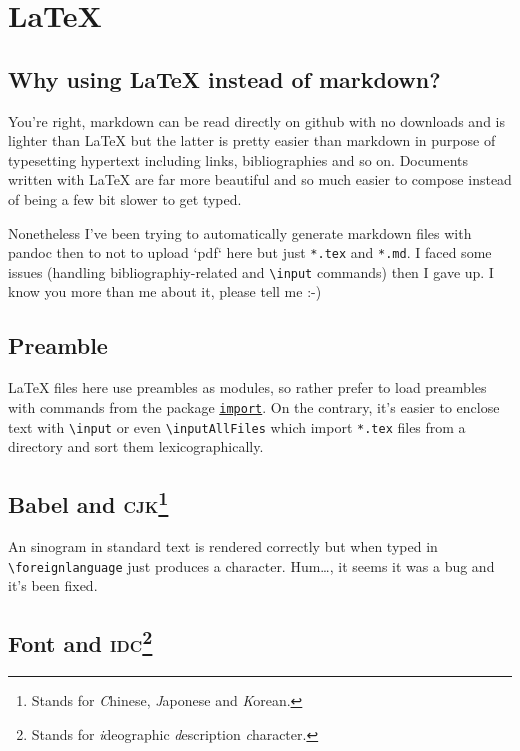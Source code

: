 \section{\LaTeX{}}

\subsection{Why using \LaTeX{} instead of markdown?}

You're right, markdown can be read directly on github with no downloads and is lighter than \LaTeX{} but the latter is pretty easier than markdown in purpose of typesetting hypertext including links, bibliographies and so on. Documents written with \LaTeX{} are far more beautiful and so much easier to compose instead of being a few bit slower to get typed.

Nonetheless I've been trying to automatically generate markdown files with pandoc then to not to upload `pdf` here but just \texttt{*.tex} and \texttt{*.md}. I faced some issues (handling bibliographiy-related and \texttt{\textbackslash{}input} commands) then I gave up. I know you more than me about it, please tell me :-)

\subsection{Preamble}

\LaTeX{} files here use preambles as modules, so rather prefer to load preambles with commands from the package \href{http://ctan.mines-albi.fr/macros/latex/contrib/import/import.pdf}{\texttt{import}}. On the contrary, it's easier to enclose text with \texttt{\textbackslash{}input} or even \texttt{\textbackslash{}inputAllFiles} which import \texttt{*.tex} files from a directory and sort them lexicographically.

\subsection{Babel and \textsc{cjk}\footnote{Stands for \textsl{C}hinese, \textsl{J}aponese and \textsl{K}orean.}}

An sinogram in standard text is rendered correctly but when typed in \texttt{\textbackslash{}foreignlanguage} just produces a  character. Hum\dots{}, it seems it was a bug and it's been fixed.

\subsection{Font and \textsc{idc}\footnote{Stands for \textsl{i}deographic \textsl{d}escription \textsl{c}haracter.}}

